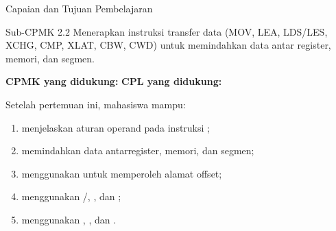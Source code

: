 \documentclass[aspectratio=169,11pt]{beamer}
\begin{document}

\begin{frame}{Capaian dan Tujuan Pembelajaran}
\begin{block}{Sub-CPMK 2.2}
\small Menerapkan instruksi transfer data (MOV, LEA, LDS/LES,
XCHG, CMP, XLAT, CBW, CWD) untuk memindahkan data antar register,
memori, dan segmen.
\end{block}

\vspace{0.1em}
{\small\textbf{CPMK yang didukung:} \quad\textbullet\quad
\textbf{CPL yang didukung:} \par}

\vspace{0.15em}
\begin{exampleblock}{Setelah pertemuan ini, mahasiswa mampu:}
\footnotesize
\begin{enumerate}
    \item menjelaskan aturan operand pada instruksi ;
    \item memindahkan data antarregister, memori, dan segmen;
    \item menggunakan  untuk memperoleh alamat offset;
    \item menggunakan /, , dan
          ;
    \item menggunakan , , dan .
\end{enumerate}
\end{exampleblock}
\end{frame}
\end{document}

